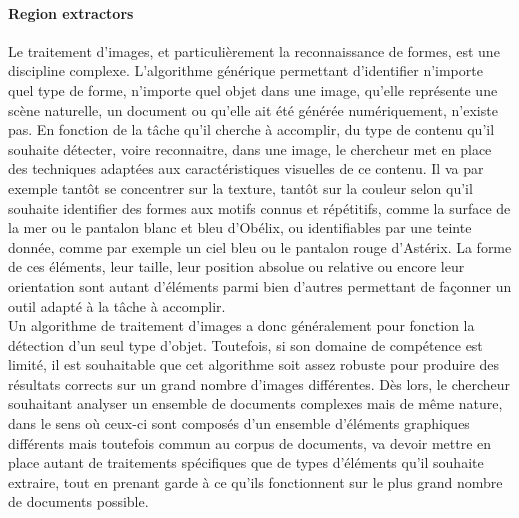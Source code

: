 \paragraph{Region extractors} %
\label{par:region_extractor}
Le traitement d'images, et particulièrement la reconnaissance de formes, est une discipline complexe.
L'algorithme générique permettant d'identifier n'importe quel type de forme, n'importe quel objet dans une image, qu'elle représente une scène naturelle, un document ou qu'elle ait été générée numériquement, n'existe pas.
En fonction de la tâche qu'il cherche à accomplir, du type de contenu qu'il souhaite détecter, voire reconnaitre, dans une image, le chercheur met en place des techniques adaptées aux caractéristiques visuelles de ce contenu.
Il va par exemple tantôt se concentrer sur la texture, tantôt sur la couleur selon qu'il souhaite identifier des formes aux motifs connus et répétitifs, comme la surface de la mer ou le pantalon blanc et bleu d'Obélix, ou identifiables par une teinte donnée, comme par exemple un ciel bleu ou le pantalon rouge d'Astérix.
La forme de ces éléments, leur taille, leur position absolue ou relative ou encore leur orientation sont autant d'éléments parmi bien d'autres permettant de façonner un outil adapté à la tâche à accomplir.\\

Un algorithme de traitement d'images a donc généralement pour fonction la détection d'un seul type d'objet.
Toutefois, si son domaine de compétence est limité, il est souhaitable que cet algorithme soit assez robuste pour produire des résultats corrects sur un grand nombre d'images différentes.
Dès lors, le chercheur souhaitant analyser un ensemble de documents complexes mais de même nature, dans le sens où ceux-ci sont composés d'un ensemble d'éléments graphiques différents mais toutefois commun au corpus de documents, va devoir mettre en place autant de traitements spécifiques que de types d'éléments qu'il souhaite extraire, tout en prenant garde à ce qu'ils fonctionnent sur le plus grand nombre de documents possible.\\

